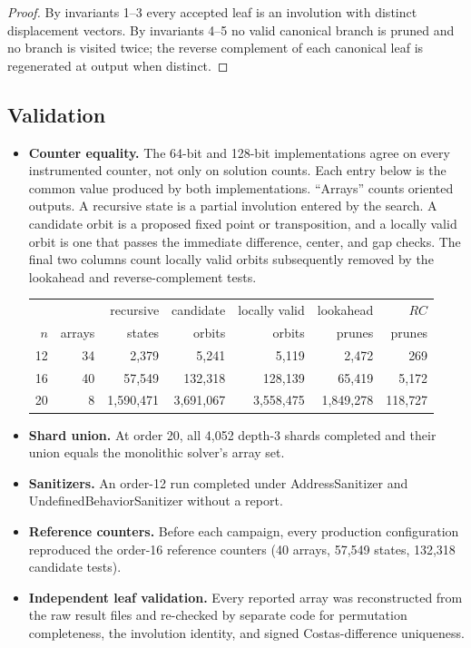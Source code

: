 \documentclass[11pt]{article}
\begin{document}
\begin{proof}
By invariants 1--3 every accepted leaf is an involution with distinct
displacement vectors.  By invariants 4--5 no valid canonical branch is
pruned and no branch is visited twice; the reverse complement of each
canonical leaf is regenerated at output when distinct.
\end{proof}

\subsection{Validation}
\label{app:validation}

\begin{itemize}
\item \textbf{Counter equality.} The 64-bit and 128-bit implementations
agree on every instrumented counter, not only on solution counts.  Each
entry below is the common value produced by both implementations.
``Arrays'' counts oriented outputs.  A recursive state is a partial
involution entered by the search.  A candidate orbit is a proposed fixed
point or transposition, and a locally valid orbit is one that passes the
immediate difference, center, and gap checks.  The final two columns count
locally valid orbits subsequently removed by the lookahead and
reverse-complement tests.

\begin{center}
\begin{tabular}{rrrrrrr}
\toprule
 & & recursive & candidate & locally valid & lookahead & $RC$ \\
$n$ & arrays & states & orbits & orbits & prunes & prunes \\
\midrule
12 & 34 & 2{,}379 & 5{,}241 & 5{,}119 & 2{,}472 & 269 \\
16 & 40 & 57{,}549 & 132{,}318 & 128{,}139 & 65{,}419 & 5{,}172 \\
20 & 8 & 1{,}590{,}471 & 3{,}691{,}067 & 3{,}558{,}475 & 1{,}849{,}278 & 118{,}727 \\
\bottomrule
\end{tabular}
\end{center}

\item \textbf{Shard union.} At order 20, all 4{,}052 depth-3 shards
completed and their union equals the monolithic solver's array set.
\item \textbf{Sanitizers.} An order-12 run completed under AddressSanitizer
and UndefinedBehaviorSanitizer without a report.
\item \textbf{Reference counters.} Before each campaign, every production
configuration reproduced the order-16 reference counters (40 arrays,
57{,}549 states, 132{,}318 candidate tests).
\item \textbf{Independent leaf validation.} Every reported array was
reconstructed from the raw result files and re-checked by separate code
for permutation completeness, the involution identity, and signed
Costas-difference uniqueness.
\end{itemize}
\end{document}
